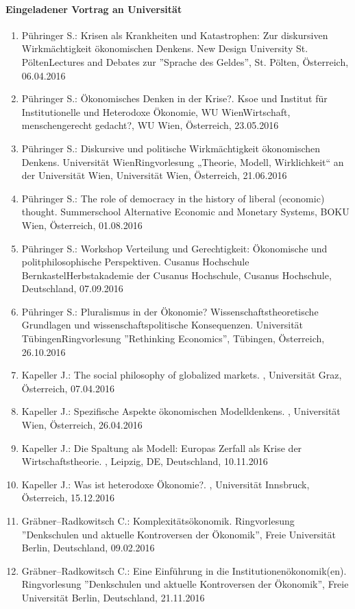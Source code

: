 \paragraph{Eingeladener Vortrag an Universität}
\begin{enumerate}
	\item Pühringer S.: Krisen als Krankheiten und Katastrophen: Zur diskursiven Wirkmächtigkeit ökonomischen Denkens. New Design University St. PöltenLectures and Debates zur ''Sprache des Geldes'', St. Pölten, Österreich, 06.04.2016
	\item Pühringer S.: Ökonomisches Denken in der Krise?. Ksoe und Institut für Institutionelle und Heterodoxe Ökonomie, WU WienWirtschaft, menschengerecht gedacht?, WU Wien, Österreich, 23.05.2016
	\item Pühringer S.: Diskursive und politische Wirkmächtigkeit ökonomischen Denkens. Universität WienRingvorlesung „Theorie, Modell, Wirklichkeit“ an der Universität Wien, Universität Wien, Österreich, 21.06.2016
	\item Pühringer S.: The role of democracy in the history of liberal (economic) thought. Summerschool Alternative Economic and Monetary Systems, BOKU Wien, Österreich, 01.08.2016
	\item Pühringer S.: Workshop Verteilung und Gerechtigkeit: Ökonomische und politphilosophische Perspektiven. Cusanus Hochschule BernkastelHerbstakademie der Cusanus Hochschule, Cusanus Hochschule, Deutschland, 07.09.2016
	\item Pühringer S.: Pluralismus in der Ökonomie? Wissenschaftstheoretische Grundlagen und wissenschaftspolitische Konsequenzen. Universität TübingenRingvorlesung ''Rethinking Economics'', Tübingen, Österreich, 26.10.2016
	\item Kapeller J.: The social philosophy of globalized markets. , Universität Graz, Österreich, 07.04.2016
	\item Kapeller J.: Spezifische Aspekte ökonomischen Modelldenkens. , Universität Wien, Österreich, 26.04.2016
	\item Kapeller J.: Die Spaltung als Modell: Europas Zerfall als Krise der Wirtschaftstheorie. , Leipzig, DE, Deutschland, 10.11.2016
	\item Kapeller J.: Was ist heterodoxe Ökonomie?. , Universität Innsbruck, Österreich, 15.12.2016
	\item Gräbner--Radkowitsch C.: Komplexitätsökonomik. Ringvorlesung ''Denkschulen und aktuelle Kontroversen der Ökonomik'', Freie Universität Berlin, Deutschland, 09.02.2016
	\item Gräbner--Radkowitsch C.: Eine Einführung in die Institutionenökonomik(en). Ringvorlesung ''Denkschulen und aktuelle Kontroversen der Ökonomik'', Freie Universität Berlin, Deutschland, 21.11.2016

\end{enumerate}
